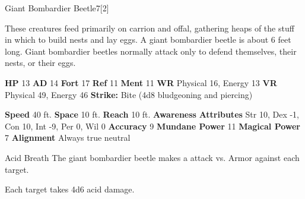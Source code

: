   \begin{monsection}{Giant Bombardier Beetle}{7}[2]
    \vspace{-1em}\vspace{-1em}
    \vspace{0em}

    
      These creatures feed primarily on carrion and offal, gathering heaps of the stuff in which to build nests and lay eggs.
      A giant bombardier beetle is about 6 feet long. Giant bombardier beetles normally attack only to defend themselves, their nests, or their eggs.
    
    

    \begin{spellcontent}
      \begin{spelltargetinginfo}
        \pari \textbf{HP} 13 \monsep
          \textbf{AD} 14 \monsep
          \textbf{Fort} 17 \monsep
          \textbf{Ref} 11 \monsep
          \textbf{Ment} 11
        \pari \textbf{WR} Physical 16, Energy 13 \monsep
        \textbf{VR} Physical 49, Energy 46
        \pari \textbf{Strike:}
            Bite  (4d8 bludgeoning and piercing)
      \end{spelltargetinginfo}
    \end{spellcontent}
    \begin{monsterfooter}
      \pari \textbf{Speed} 40 ft. \monsep
        \textbf{Space} 10 ft. \monsep
        \textbf{Reach} 10 ft.
      \pari \textbf{Awareness} 
      \pari \textbf{Attributes}
        Str 10, Dex -1,
        Con 10, Int -9,
        Per 0, Wil 0
      \pari \textbf{Accuracy} 9 \monsep
        \textbf{Mundane Power} 11 \monsep
      \textbf{Magical Power} 7
      \pari \textbf{Alignment} Always true neutral
    \end{monsterfooter}
  \end{monsection}
  \begin{freeability}{Acid Breath}
       The giant bombardier beetle makes a  attack
        vs. Armor against each target.
    
    \hit Each target takes 4d6 acid damage.
    \end{freeability}
  
